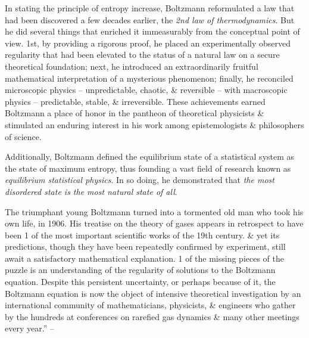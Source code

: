 \documentclass{article}
\numberwithin{equation}{section}
\begin{document}
In stating the principle of entropy increase, Boltzmann reformulated a law that had been discovered a few decades earlier, the \textit{2nd law of thermodynamics}. But he did several things that enriched it immeasurably from the conceptual point of view. 1st, by providing a rigorous proof, he placed an experimentally observed regularity that had been elevated to the status of a natural law on a secure theoretical foundation; next, he introduced an extraordinarily fruitful mathematical interpretation of a mysterious phenomenon; finally, he reconciled microscopic physics -- unpredictable, chaotic, \& reversible -- with macroscopic physics -- predictable, stable, \& irreversible. These achievements earned Boltzmann a place of honor in the pantheon of theoretical physicists \& stimulated an enduring interest in his work among epistemologists \& philosophers of science.

Additionally, Boltzmann defined the equilibrium state of a statistical system as the state of maximum entropy, thus founding a vast field of research known as \textit{equilibrium statistical physics}. In so doing, he demonstrated that \textit{the most disordered state is the most natural state of all}.

The triumphant young Boltzmann turned into a tormented old man who took his own life, in 1906. His treatise on the theory of gases appears in retrospect to have been 1 of the most important scientific works of the 19th century. \& yet its predictions, though they have been repeatedly confirmed by experiment, still await a satisfactory mathematical explanation. 1 of the missing pieces of the puzzle is an understanding of the regularity of solutions to the Boltzmann equation. Despite this persistent uncertainty, or perhaps because of it, the Boltzmann equation is now the object of intensive theoretical investigation by an international community of mathematicians, physicists, \& engineers who gather by the hundreds at conferences on rarefied gas dynamics \& many other meetings every year.'' -- \cite[pp. 6--11]{Villani2015}


\printbibliography[heading=bibintoc]
	
\end{document}

